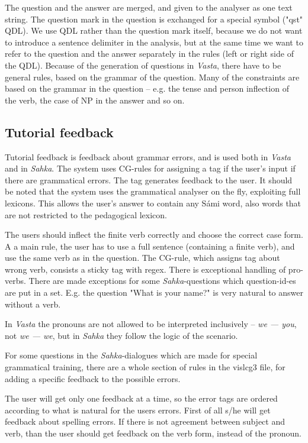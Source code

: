 \documentclass[11pt]{article}
\begin{document}
The question and the answer are merged, and given to the analyser as one text string. The question mark in the question is exchanged for a special symbol ("qst" QDL). We use QDL rather than the question mark itself, because we do not want to introduce a sentence delimiter in the analysis, but at the same time we want to refer to the question and the answer separately in the rules (left or right side of the QDL). Because of the generation of questions in \textit{Vasta}, there have to be general rules, based on the grammar of the question. Many of the constraints are based on the grammar in the question -- e.g. the tense and person inflection of the verb, the case of NP in the answer and so on.

\subsection{Tutorial feedback}
Tutorial feedback is feedback about grammar errors, and is used both in \textit{Vasta} and in \textit{Sahka}. The system uses CG-rules for assigning a tag if the user's input if there are grammatical errors. The tag generates feedback to the user. It should be noted that the system uses the grammatical analyser on the fly, exploiting full lexicons. This allows the user's answer to contain any Sámi word, also words that are not restricted to the pedagogical lexicon.

The users should inflect the finite verb correctly and choose the correct case form. A a main rule, the user has to use a full sentence (containing a finite verb), and use the same verb as in the question. The CG-rule, which assigns tag about wrong verb, consists a sticky tag with regex. There is exceptional handling of pro-verbs. There are made exceptions for some \textit{Sahka}-questions which question-id-es are put in a set. E.g. the question "What is your name?" is very natural to answer without a verb. 

In \textit{Vasta} the pronouns are not allowed to be interpreted inclusively -- \textit{we — you}, not \textit{we — we}, but in \textit{Sahka} they follow the logic of the scenario.

For some questions in the \textit{Sahka}-dialogues which are made for special grammatical training, there are a whole section of rules in the vislcg3 file, for adding a specific feedback to the possible errors.

The user will get only one feedback at a time, so the error tags are ordered according to what is natural for the users errors. First of all s/he will get feedback about spelling errors. If there is not agreement between subject and verb, than the user should get feedback on the verb form, instead of the pronoun.
\end{document}
